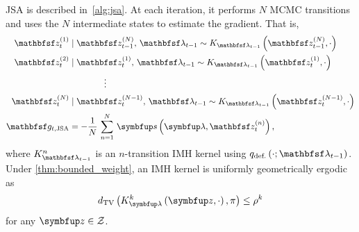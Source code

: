 \begin{proofEnd}

  JSA is described in~\cref{alg:jsa}. 
  At each iteration, it performs \(N\) MCMC transitions and uses the \(N\) intermediate states to estimate the gradient.
  That is,
  \begin{align*}
    \rvvz^{(1)}_{t} &\mid \rvvz_{t-1}^{(N)},\, \rvvlambda_{t-1} \sim K_{\rvvlambda_{t-1}}\left(\rvvz_{t-1}^{(N)}, \cdot\right) \\
    \rvvz^{(2)}_{t} &\mid \rvvz^{(1)}_{t},\, \rvvlambda_{t-1}  \sim K_{\rvvlambda_{t-1}}\left(\rvvz_{t}^{(1)}, \cdot\right) \\
    &\qquad\qquad\vdots
    \\
    \rvvz^{(N)}_{t} &\mid \rvvz^{(N-1)}_{t},\, \rvvlambda_{t-1}  \sim K_{\rvvlambda_{t-1}}\left(\rvvz_{t}^{(N-1)}, \cdot\right)
    \\
    \rvvg_{t,\text{JSA}}  &= -\frac{1}{N}\,\sum^{N}_{n=1} \, \vs\left(\vlambda, \rvvz^{(n)}_t\right),
  \end{align*}
  where \(K_{\rvvlambda_{t-1}}^n\) is an \(n\)-transition IMH kernel using \(q_{\text{def.}}\left(\cdot; \rvvlambda_{t-1}\right)\).
  Under \cref{thm:bounded_weight}, an IMH kernel is uniformly geometrically ergodic~\citep{10.2307/2242610, wang_exact_2022} as
  \begin{align}
    \DTV{K_{\vlambda}^k\left(\vz, \cdot\right)}{\pi} \leq \rho^{k}\label{eq:imh_ergodicity}
  \end{align}
  for any \(\vz \in \mathcal{Z}\).


\end{proofEnd}
